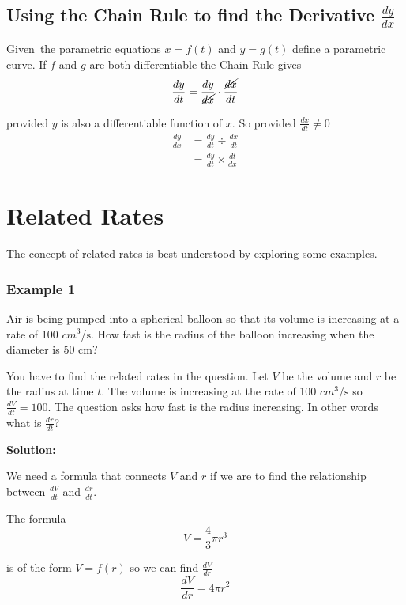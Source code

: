 \subsection*{Using the Chain Rule to find the Derivative $\frac{d y}{d x}$}
Given\ the parametric equations $x =f (t)$ and $y =g (t)$ define a parametric curve. If $f$ and $g$ are both differentiable the Chain Rule gives
\begin{equation*}\frac{d y}{d t} =\frac{d y}{\cancel{d x}} \cdot \frac{\cancel{d x}}{d t}
\end{equation*}

provided $y$ is also a differentiable function of $x$. So provided $\frac{d x}{d t} \neq 0$
\begin{align*}\frac{d y}{d x} &  = \frac{d y}{d t} \div \frac{d x}{d t} \\
 &  = \frac{d y}{d t} \times \frac{d t}{d x}\end{align*}



\section{Related Rates}
The concept of related rates is best understood by exploring some examples. 

\subsubsection{Example 1}
Air is being pumped into a spherical balloon so that its volume is increasing at a rate of 100 $cm^{3}$/$\mbox{s}$. How fast is the radius of
the balloon increasing when the diameter is 50 $\mbox{cm}$? 

You have to find the related rates in the question. Let
$V$ be the volume and $r$ be the radius at time $t$. The volume is increasing at the rate of 100 $cm^{3}$/$\mbox{s}$ so $\frac{d V}{d t} =100$. The question asks how fast is the radius increasing. In
other words what is $\frac{d r}{d t}$? 

\textbf{Solution:} 

We need a formula that connects $V$ and $r$ if we are to find the relationship between $\frac{d V}{d t}$ and $\frac{d r}{d t}$. 

The formula
\begin{equation*}V =\frac{4}{3} \pi  r^{3}
\end{equation*}

is of the form $V =f (r)$ so we can find $\frac{d V}{d r}$
\begin{equation}\frac{d V}{d r} =4 \pi  r^{2}\tag{1}
\end{equation}

